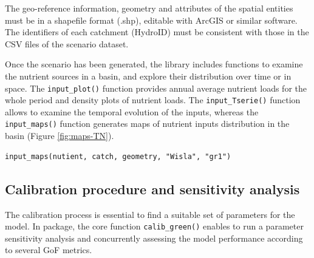\noindent The geo-reference information, geometry and attributes of the spatial entities must be in a shapefile format (.shp), editable with ArcGIS or similar software. The identifiers of each catchment (HydroID) must be consistent with those in the CSV files of the scenario dataset.

Once the scenario has been generated, the library includes functions to examine the nutrient sources in a basin, and explore their distribution over time or in space. The \texttt{input\_plot()} function provides annual average nutrient loads for the whole period and density plots of nutrient loads. The \texttt{input\_Tserie()} function allows to examine the temporal evolution of the inputs, whereas the \texttt{input\_maps()} function generates maps of nutrient inputs distribution in the basin (Figure \ref{fig:maps-TN}).

\begin{verbatim}
input_maps(nutient, catch, geometry, "Wisla", "gr1")
\end{verbatim}

\hypertarget{calibration-procedure-and-sensitivity-analysis}{%
\subsection{Calibration procedure and sensitivity analysis}\label{calibration-procedure-and-sensitivity-analysis}}

The calibration process is essential to find a suitable set of parameters for the model. In  package, the core function \texttt{calib\_green()} enables to run a parameter sensitivity analysis and concurrently assessing the model performance according to several GoF metrics.

